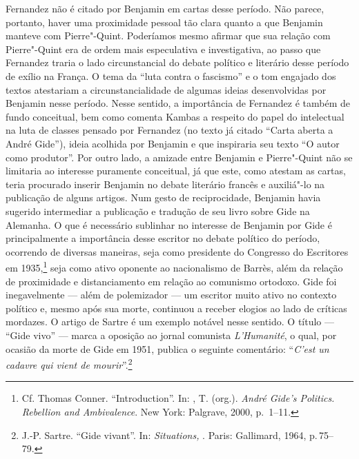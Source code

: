 Fernandez não é citado por Benjamin em cartas desse período. Não parece,
portanto, haver uma proximidade pessoal tão clara quanto a que Benjamin
manteve com Pierre"-Quint. Poderíamos mesmo afirmar que sua relação com
Pierre"-Quint era de ordem mais especulativa e investigativa, ao passo
que Fernandez traria o lado circunstancial do debate político e
literário desse período de exílio na França. O tema da ``luta contra o
fascismo'' e o tom engajado dos textos atestariam a
circunstancialidade de algumas ideias desenvolvidas por Benjamin nesse
período. Nesse sentido, a importância de Fernandez é também de fundo
conceitual, bem como comenta Kambas a respeito do papel do intelectual
na luta de classes pensado por Fernandez (no texto já citado ``Carta
aberta a André Gide''), ideia acolhida por Benjamin e que inspiraria seu
texto ``O autor como produtor''. Por outro lado, a amizade entre
Benjamin e Pierre"-Quint não se limitaria ao interesse puramente
conceitual, já que este, como atestam as cartas, teria procurado
inserir Benjamin no debate literário francês e auxiliá"-lo na publicação
de alguns artigos. Num gesto de reciprocidade, Benjamin havia sugerido intermediar a publicação e tradução de seu livro sobre Gide na Alemanha. O que é
necessário sublinhar no interesse de Benjamin por Gide é
principalmente a importância desse escritor no debate político do
período, ocorrendo de diversas maneiras, seja como presidente do
Congresso do Escritores em 1935,\footnote{Cf. Thomas Conner.
  ``Introduction''. In: , T. (org.). \emph{André Gide's Politics.
  Rebellion and Ambivalence}. New York: Palgrave, 2000, p.~1--11.} seja
como ativo oponente ao nacionalismo de Barrès, além da relação de
proximidade e distanciamento em relação ao comunismo ortodoxo. Gide foi
inegavelmente --- além de polemizador --- um escritor muito ativo no
contexto político e, mesmo após sua morte, continuou a receber elogios
ao lado de críticas mordazes. O artigo de Sartre é um exemplo notável
nesse sentido. O título --- ``Gide vivo'' --- marca a oposição ao jornal
comunista \emph{L'Humanité}, o qual, por ocasião da morte de Gide em
1951, publica o seguinte comentário: ``\emph{C'est un cadavre qui vient de
mourir}''.\footnote{J.-P. Sartre. ``Gide vivant''. In: \emph{Situations, }. Paris: Gallimard, 1964, p.\,75--79.}

